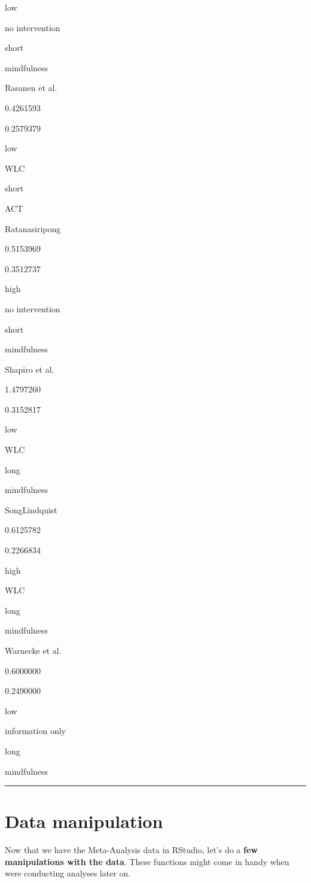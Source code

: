 \documentclass[]{book}
\begin{document}
low

no intervention

short

mindfulness

Rasanen et al.

0.4261593

0.2579379

low

WLC

short

ACT

Ratanasiripong

0.5153969

0.3512737

high

no intervention

short

mindfulness

Shapiro et al.

1.4797260

0.3152817

low

WLC

long

mindfulness

SongLindquist

0.6125782

0.2266834

high

WLC

long

mindfulness

Warnecke et al.

0.6000000

0.2490000

low

information only

long

mindfulness

\begin{center}\rule{0.5\linewidth}{\linethickness}\end{center}

\hypertarget{data-manipulation}{%
\section{Data manipulation}\label{data-manipulation}}

Now that we have the Meta-Analysis data in RStudio, let's do a \textbf{few manipulations with the data}. These functions might come in handy when were conducting analyses later on.
\end{document}
